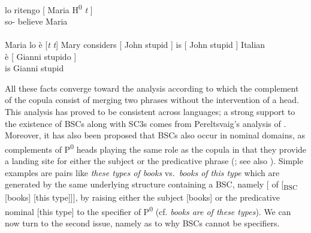 \documentclass[output=paper]{langsci/langscibook}
\begin{document}
\ea\label{ex:key:28.3}
    \\
        \gll \llap{*}lo ritengo [ Maria H\textsuperscript{0} \emph{t} ]\\
            so-\Cl{} believe {} Maria {} {}\\
    \ex {}\\
        Maria lo è [\emph{t} \emph{t}]
    \ex Mary considers [ John stupid ]
    \ex \makebox[0pt][r]{*}is [ John stupid ]
    \ex Italian\\
        \gll \llap{*}è [ Gianni stupido ]\\
                is {} Gianni stupid\\
    \z
\z

All these facts converge toward the analysis according to which the complement
of the copula consist of merging two phrases without the
intervention of a head. This analysis has proved to be consistent across
languages; a strong support to the existence of \glspl{BSC}
along with \glspl{SC3} comes from Pereltsvaig's analysis of 
\citep{Pereltsvaig2007}. Moreover, it has also been proposed that
\glspl{BSC} also occur in nominal domains, as complements of
P\textsuperscript{0} heads playing the same role as the copula in
that they provide a landing site for either the subject or the
predicative phrase (\citealt{Moro2000}; see also
\citealt{Kayne1994,denDikken1997,Zamparelli2000}). Simple
examples are pairs like \emph{these types of books} vs.\ \emph{books of this
type} which are generated by the same underlying structure containing a
\gls{BSC}, namely [ of [\textsubscript{BSC} [books] [this type]]], by raising
either the subject [books] or the predicative nominal [this
type] to the specifier of P\textsuperscript{0} (cf. \emph{books are of these
types}). We can now turn to the second issue, namely as to why
\glspl{BSC} cannot be specifiers.
\end{document}
